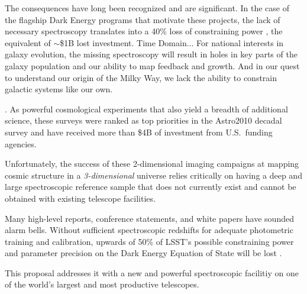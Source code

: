\documentclass[oneside,11pt]{amsart}
\begin{document}
The consequences have long been recognized \citep{NAP21722} and are significant.  In the case of the flagship Dark Energy programs that motivate these projects, the lack of necessary spectroscopy translates into a 40\% loss of constraining power \citep{newman15}, the equivalent of $\sim$\$1B lost investment.  Time Domain... For national interests in galaxy evolution, the missing spectroscopy will result in holes in key parts of the galaxy population and our ability to map feedback and growth.  And in our quest to understand our origin of the Milky Way, we lack the ability to constrain galactic systems like our own.  


.  As powerful cosmological experiments that also yield a breadth of additional science, these surveys were ranked as top priorities in the Astro2010 decadal survey and have received more than \$4B of investment from U.S.\ funding agencies.

Unfortunately, the success of these 2-dimensional imaging campaigns at mapping cosmic structure in a {\em 3-dimensional} universe relies critically on having a deep and large spectroscopic reference sample that does not currently exist and cannot be obtained with existing telescope facilities.

Many high-level reports, conference statements, and white papers have sounded alarm bells.  Without sufficient spectroscopic redshifts for adequate photometric training and calibration, upwards of 50\% of LSST's possible constraining power and parameter precision on the Dark Energy Equation of State will be lost \citep{newman15}.  

 This proposal addresses it with a new and powerful spectroscopic facilitiy on one of the world's largest and most productive telescopes.  



\end{document}
